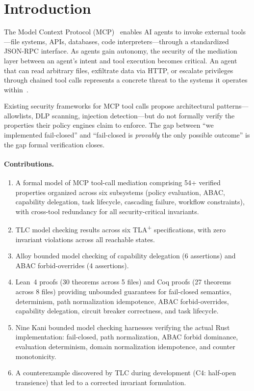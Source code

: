 \documentclass[sigplan,screen,nonacm]{acmart}
\newcommand{\tlaplus}{TLA\textsuperscript{+}\xspace}
\begin{document}
\section{Introduction}
\label{sec:intro}

The Model Context Protocol (MCP)~\cite{mcp2025} enables AI agents to invoke
external tools---file systems, APIs, databases, code interpreters---through a
standardized JSON-RPC interface. As agents gain autonomy, the security of the
mediation layer between an agent's intent and tool execution becomes critical.
An agent that can read arbitrary files, exfiltrate data via HTTP, or escalate
privileges through chained tool calls represents a concrete threat to the
systems it operates within~\cite{narajala2024,owasp2026}.

Existing security frameworks for MCP tool calls propose architectural
patterns---allowlists, DLP scanning, injection detection---but do not formally
verify the properties their policy engines claim to enforce. The gap between
``we implemented fail-closed'' and ``fail-closed is \emph{provably} the only
possible outcome'' is the gap formal verification closes.

\paragraph{Contributions.}
\begin{enumerate}
  \item A formal model of MCP tool-call mediation comprising 54+ verified
    properties organized across six subsystems (policy evaluation, ABAC,
    capability delegation, task lifecycle, cascading failure, workflow
    constraints), with cross-tool redundancy for all security-critical
    invariants.
  \item TLC model checking results across six \tlaplus specifications,
    with zero invariant violations across all reachable states.
  \item Alloy bounded model checking of capability delegation (6 assertions)
    and ABAC forbid-overrides (4 assertions).
  \item Lean~4 proofs (30 theorems across 5 files) and Coq proofs (27
    theorems across 8 files) providing unbounded guarantees for fail-closed
    semantics, determinism, path normalization idempotence, ABAC
    forbid-overrides, capability delegation, circuit breaker correctness,
    and task lifecycle.
  \item Nine Kani bounded model checking harnesses verifying the actual
    Rust implementation: fail-closed, path normalization, ABAC forbid
    dominance, evaluation determinism, domain normalization idempotence,
    and counter monotonicity.
  \item A counterexample discovered by TLC during development (C4:
    half-open transience) that led to a corrected invariant formulation.
\end{enumerate}
\end{document}
